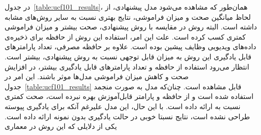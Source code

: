  \begin{table}
 	\centering
 	\caption[مقایسه‌ی روش پیشنهادی با سایر روش‌ها]{مقایسه روش  با سایر روش‌های یادگیری پیوسته روی مجموعه‌داده  بر اساس  صحت، میزان فراموشی، تعداد پارامترها و حافظه مورد استفاده.}
 	\label{table:ucf101_results}
 	\begin{LTR}
 	\end{LTR}
 \end{table}
  در جدول~\ref{table:ucf101_results}، همان‌طور که مشاهده می‌شود مدل پیشنهادی، از لحاظ میانگین صحت و میزان فراموشی، نتایج بهتری نسبت به سایر روش‌های مشابه داشته است. البته روش  در مقایسه با روش پیشنهادی، صحت بیشتر و میزان فراموشی کمتری کسب کرده است. علت این امر، استفاده این روش از حافظه برای ذخیره‌ی داده‌های ویدیویی وظایف پیشین بوده است. علاوه بر حافظه‌ مصرفی، تعداد پارامترهای قابل یادگیری این روش به میزان قابل توجهی نسبت به روش پیشنهادی، بیشتر است. انتظار می‌رود استفاده از حافظه و تعداد پارامترهای قابل یادگیری بیشتر، در افزایش صحت و کاهش میزان فراموشی مدل‌ها موثر باشند. این امر در جدول~\ref{table:ucf101_results} قابل مشاهده است. چنان‌که مدل  به صورت منجمد استفاده شده است و از حافظه و پارامتر قابل‌آموزش بهره نبرده است، صحت کمتری نسبت به  ارائه داده است. با این حال، این مدل علیرغم آنکه برای یادگیری پیوسته طراحی نشده است، نتایج نسبتا خوبی در حالت یادگیری بدون نمونه ارائه داده است. یکی از دلایلی که این روش در معماری 
